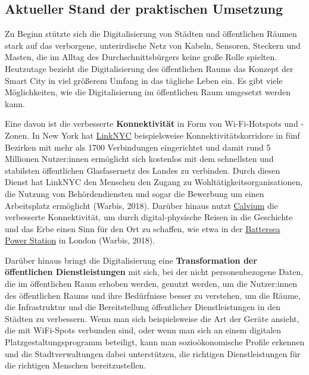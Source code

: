\documentclass[
]{book}
\begin{document}
\hypertarget{aktueller-stand-der-praktischen-umsetzung-6}{%
\subsection*{Aktueller Stand der praktischen Umsetzung}\label{aktueller-stand-der-praktischen-umsetzung-6}}

Zu Beginn stützte sich die Digitalisierung von Städten und öffentlichen Räumen stark auf das verborgene, unterirdische Netz von Kabeln, Sensoren, Steckern und Masten, die im Alltag des Durchschnittsbürgers keine große Rolle spielten. Heutzutage bezieht die Digitalisierung des öffentlichen Raums das Konzept der Smart City in viel größerem Umfang in das tägliche Leben ein. Es gibt viele Möglichkeiten, wie die Digitalisierung im öffentlichen Raum umgesetzt werden kann.

Eine davon ist die verbesserte \textbf{Konnektivität } in Form von Wi-Fi-Hotspots und -Zonen. In New York hat \href{https://www.link.nyc/}{LinkNYC} beispielsweise Konnektivitätskorridore in fünf Bezirken mit mehr als 1700 Verbindungen eingerichtet und damit rund 5 Millionen Nutzer:innen ermöglicht sich kostenlos mit dem schnellsten und stabilsten öffentlichen Glasfasernetz des Landes zu verbinden. Durch diesen Dienst hat LinkNYC den Menschen den Zugang zu Wohltätigkeitsorganisationen, die Nutzung von Behördendiensten und sogar die Bewerbung um einen Arbeitsplatz ermöglicht (Warbis, 2018). Darüber hinaus nutzt \href{https://calvium.com/}{Calvium} die verbesserte Konnektivität, um durch digital-physische Reisen in die Geschichte und das Erbe einen Sinn für den Ort zu schaffen, wie etwa in der \href{https://calvium.com/projects/battersea-power-station-redevelopment/}{Battersea Power Station} in London (Warbis, 2018).

Darüber hinaus bringt die Digitalisierung eine \textbf{Transformation der öffentlichen Dienstleistungen} mit sich, bei der nicht personenbezogene Daten, die im öffentlichen Raum erhoben werden, genutzt werden, um die Nutzer:innen des öffentlichen Raums und ihre Bedürfnisse besser zu verstehen, um die Räume, die Infrastruktur und die Bereitstellung öffentlicher Dienstleistungen in den Städten zu verbessern. Wenn man sich beispielsweise die Art der Geräte ansieht, die mit WiFi-Spots verbunden sind, oder wenn man sich an einem digitalen Platzgestaltungsprogramm beteiligt, kann man sozioökonomische Profile erkennen und die Stadtverwaltungen dabei unterstützen, die richtigen Dienstleistungen für die richtigen Menschen bereitzustellen.
\end{document}
